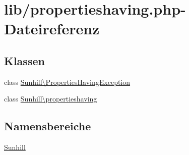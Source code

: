\hypertarget{propertieshaving_8php}{}\section{lib/propertieshaving.php-\/\+Dateireferenz}
\label{propertieshaving_8php}
\subsection*{Klassen}
\begin{DoxyCompactItemize}
\item 
class \hyperlink{classSunhill_1_1PropertiesHavingException}{Sunhill\textbackslash{}\+Properties\+Having\+Exception}
\item 
class \hyperlink{classSunhill_1_1propertieshaving}{Sunhill\textbackslash{}propertieshaving}
\end{DoxyCompactItemize}
\subsection*{Namensbereiche}
\begin{DoxyCompactItemize}
\item 
 \hyperlink{namespaceSunhill}{Sunhill}
\end{DoxyCompactItemize}
